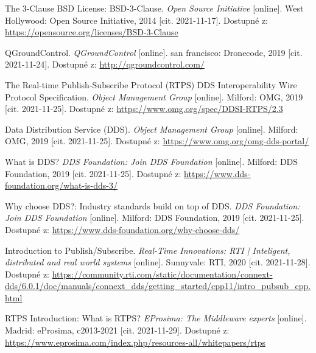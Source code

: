

\begin{thebibliography}{99}
	
The 3-Clause BSD License: BSD-3-Clause. \textit{Open Source Initiative} [online]. West Hollywood: Open Source Initiative, 2014 [cit. 2021-11-17]. Dostupné z: \url{https://opensource.org/licenses/BSD-3-Clause}

QGroundControl. \textit{QGroundControl} [online]. san francisco: Dronecode, 2019 [cit. 2021-11-24]. Dostupné z: \url{http://qgroundcontrol.com/}

The Real-time Publish-Subscribe Protocol (RTPS) DDS Interoperability Wire Protocol Specification. \textit{Object Management Group} [online]. Milford: OMG, 2019 [cit. 2021-11-25]. Dostupné z: \url{https://www.omg.org/spec/DDSI-RTPS/2.3}
	
Data Distribution Service (DDS). \textit{Object Management Group} [online]. Milford: OMG, 2019 [cit. 2021-11-25]. Dostupné z: \url{https://www.omg.org/omg-dds-portal/}

What is DDS? \textit{DDS Foundation: Join DDS Foundation} [online]. Milford: DDS Foundation, 2019 [cit. 2021-11-25]. Dostupné z: \url{https://www.dds-foundation.org/what-is-dds-3/}

Why choose DDS?: Industry standards build on top of DDS. \textit{DDS Foundation: Join DDS Foundation} [online]. Milford: DDS Foundation, 2019 [cit. 2021-11-25]. Dostupné z: \url{https://www.dds-foundation.org/why-choose-dds/}

Introduction to Publish/Subscribe. \textit{Real-Time Innovations: RTI | Inteligent, distributed and real world systems} [online]. Sunnyvale: RTI, 2020 [cit. 2021-11-28]. Dostupné z: \url{https://community.rti.com/static/documentation/connext-dds/6.0.1/doc/manuals/connext\_dds/getting\_started/cpp11/intro\_pubsub\_cpp.html}

RTPS Introduction: What is RTPS? \textit{EProsima: The Middleware experts} [online]. Madrid: eProsima, c2013-2021 [cit. 2021-11-29]. Dostupné z: \url{https://www.eprosima.com/index.php/resources-all/whitepapers/rtps}


\end{thebibliography}
